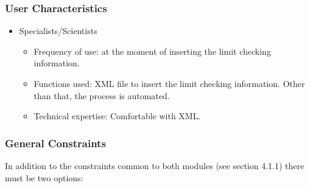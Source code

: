 \subsubsection{User Characteristics}

\begin{itemize}
\item Specialists/Scientists
\begin{itemize}
\item Frequency of use: at the moment of inserting the limit checking information.
\item Functions used: XML file to insert the limit checking information. Other than that, the process is automated.
\item Technical expertise: Comfortable with XML.
\end{itemize}
\end{itemize}


\subsubsection{General Constraints}

In addition to the constraints common to both modules (see section 4.1.1) there must be two options:

